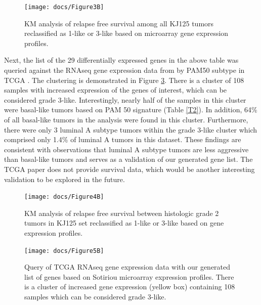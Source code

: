 \documentclass[a4paper,10pt]{article}
\begin{document}
\begin{figure}[b!]
\centering
\texttt{[image: docs/Figure3B]}
\caption{ KM analysis of relapse free survival among all 
KJ125 tumors reclassified as 1-like or 3-like based on 
microarray gene expression profiles.}\label{3B}
\end{figure}
Next, the list of the 29 differentially expressed genes in the above table was queried against 
the RNAseq gene expression data from by PAM50 subtype in TCGA \cite{Nature1}.  
The clustering is demonstrated in Figure \ref{5B}.  There is a cluster of 108 samples with 
increased expression of the genes of interest, which can be considered grade 3-like. 
 Interestingly, nearly half of the samples in this cluster were basal-like tumors based on 
PAM 50 signature (Table \ref{T2}).  In addition, 64\% of all basal-like tumors in the 
analysis were found in this cluster. Furthermore, there were only 3 luminal A subtype
 tumors within the grade 3-like cluster which comprised only 1.4\% of luminal A tumors
 in this dataset. These findings are consistent with observations that luminal A subtype
 tumors are less aggressive than basal-like tumors and serves as a validation of our 
generated gene list. The TCGA paper does not provide survival data, which would 
be another interesting validation to be explored in the future.\\
\begin{figure}
\centering
\texttt{[image: docs/Figure4B]}
\caption{ KM analysis of relapse free survival between 
histologic grade 2 tumors in KJ125 set reclassified as 
1-like or 3-like based on gene expression profiles.}\label{4B}
\end{figure}

 \begin{figure}
\centering
\texttt{[image: docs/Figure5B]}
\caption{ Query of TCGA RNAseq gene expression data with our generated list of genes 
based on Sotiriou microarray expression profiles.  There is a cluster of increased gene 
expression (yellow box) containing 108 samples which can be considered grade 3-like.}\label{5B}
\end{figure}
\end{document}
